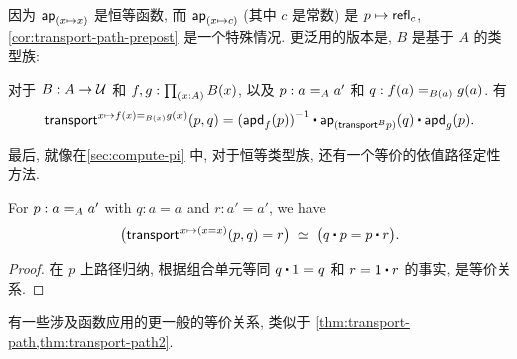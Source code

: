 因为 $\apfunc{(x \mapsto x)}$ 是恒等函数, 而 $\apfunc{(x \mapsto c)}$ (其中 $c$ 是常数) 是 $p \mapsto\refl{c}$, \cref{cor:transport-path-prepost} 是一个特殊情况.
更泛用的版本是, $B$ 是基于 $A$ 的类型族:

\begin{thm}
    \label{thm:transport-path2}
    对于 $B : A \to \type$ 和 $f,g : \prd{x:A} B(x)$, 以及 $p : \id[A]{a}{a'}$ 和 $q : \id[B(a)]{f(a)}{g(a)}$.
    有
    \begin{equation*}
        \transfib{x \mapsto \id[B(x)]{f(x)}{g(x)}}{p}{q} =
        \opp{(\apdfunc{f}(p))} \ct \apfunc{(\transfibf{B}{p})}(q) \ct \apdfunc{g}(p).
    \end{equation*}
\end{thm}

最后, 就像在\cref{sec:compute-pi} 中, 对于恒等类型族, 还有一个等价的依值路径定性方法.

\begin{thm}
    \label{thm:dpath-path}
    For $p:\id[A]a{a'}$ with $q:a=a$ and $r:a'=a'$, we have
    \[ \eqvspaced{ \big(\transfib{x\mapsto (x=x)}{p}{q} = r \big) }{ \big( q \ct p = p \ct r \big). } \]
\end{thm}
\begin{proof}
    在 $p$ 上路径归纳, 根据组合单元等同 $q\ct 1 = q$ 和 $r = 1\ct r$ 的事实, 是等价关系.
\end{proof}

有一些涉及函数应用的更一般的等价关系, 类似于 \cref{thm:transport-path,thm:transport-path2}.

%